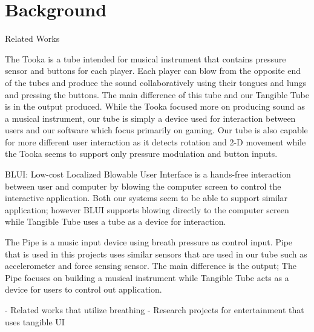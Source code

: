 \section{Background}\label{sec:background}

Related Works

The Tooka is a tube intended for musical instrument that contains pressure sensor and buttons for each player. Each player can blow from the opposite end of the tubes and produce the sound collaboratively using their tongues and lungs and pressing the buttons. The main difference of this tube and our Tangible Tube is in the output produced. While the Tooka focused more on producing sound as a musical instrument, our tube is simply a device used for interaction between users and our software which focus primarily on gaming. Our tube is also capable for more different user interaction as it detects rotation and 2-D movement while the Tooka seems to support only pressure modulation and button inputs.

BLUI: Low-cost Localized Blowable User Interface is a hands-free interaction between user and computer by blowing the computer screen to control the interactive application. Both our systems seem to be able to support similar application; however BLUI supports blowing directly to the computer screen while Tangible Tube uses a tube as a device for interaction.

The Pipe is a music input device using breath pressure as control input. Pipe that is used in this projects uses similar sensors that are used in our tube such as accelerometer and force sensing sensor. The main difference is the output; The Pipe focuses on building a musical instrument while Tangible Tube acts as a device for users to control out application.


\TODO
- Related works that utilize breathing \newline
- Research projects for entertainment that uses tangible UI
